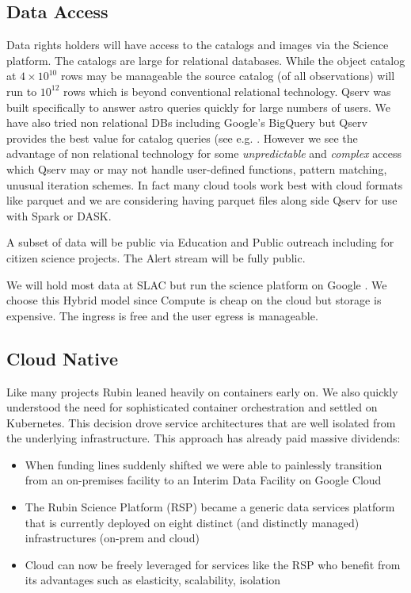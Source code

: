 \documentclass[11pt,twoside]{article}
\begin{document}
\begin{centering}
\end{centering}


\subsection{Data Access} \label{sec:dataaccess}

Data rights holders will have access to the catalogs and images via the Science platform.
The catalogs are large for relational databases.
While the object catalog at $4 \times 10^{10}$ rows may be manageable
the source catalog (of all observations) will run to $ 10^{12}$ rows which is beyond conventional relational technology.
Qserv \citep{C15_adassxxxii} was built specifically to answer astro queries quickly for large numbers of users.
We have also tried non relational DBs including Google's BigQuery but Qserv provides the best value for catalog queries (see e.g. \citet{Document-31100}.
However we see the advantage of non relational technology for
some  \emph{unpredictable} and \emph{complex} access which Qserv may or may not handle user-defined functions, pattern matching, unusual iteration schemes.
In fact many cloud tools work best with cloud formats like parquet and
 we are considering having parquet files along side Qserv for use with Spark or DASK.

A subset of data will be public via Education and Public outreach including for citizen science projects.
The Alert stream will be fully public.

We will hold most data at SLAC but run the science platform on Google \citep{2021arXiv211115030O}.
We choose this Hybrid model since Compute is cheap on the cloud but storage is expensive.
The ingress is free and the user egress is manageable.

\subsection{Cloud Native}\label{sec:cloudnative}
Like many projects \citep{2017ASPC..512...33O} Rubin leaned heavily on containers early on.
We also quickly understood the need for sophisticated container orchestration and settled on Kubernetes.
This decision drove service architectures that are well isolated from the underlying infrastructure.
This approach has already paid massive dividends:

\begin{itemize}
\item When funding lines suddenly shifted we were able to painlessly transition from an on-premises facility to an Interim Data Facility on Google Cloud
\item The Rubin Science Platform (RSP) became a generic data services platform that is currently deployed on eight distinct (and distinctly managed) infrastructures (on-prem and cloud)
\item Cloud can now be freely leveraged for services like the RSP who benefit from its advantages such as elasticity, scalability, isolation
\end{itemize}
\end{document}
